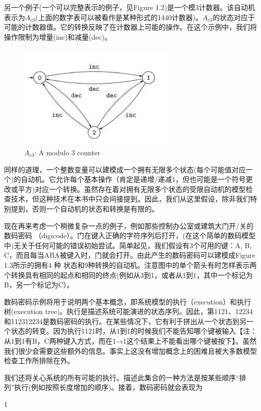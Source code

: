 \documentclass{book}
\begin{document}
    另一个例子(一个可以完整表示的例子，见Figure 1.2)是一个模3计数器。该自动机表示为$A_{c3}$(上面的数字表可以被看作是某种形式的1440计数器)。$A_{c3}$的状态对应于可能的计数器值。它的转换反映了在计数器上可能的操作。在这个示例中，我们将操作限制为增量(inc)和减量(dec)。
    \begin{figure}
    \centering
    \includegraphics[height=2.0in,width=3.0in]{1_2.jpg}
    \caption{$A_{c3}$: A modulo 3 counter}
    \end{figure}


    同样的道理，一个整数变量可以建模成一个拥有无限多个状态(每个可能值对应一个)的自动机。它允许每个基本操作（肯定是递增/递减1，但也可能是一个符号更改或平方)对应一个转换。虽然存在着对拥有无限多个状态的受限自动机的模型检查技术，但这种技术在本书中只会间接提到。因此，我们从这里假设，除非我们特别提到，否则一个自动机的状态和转换是有限的。

    现在再来考虑一个稍微复杂一点的例子，例如那些控制办公室或建筑大门开/关的数码密码  （digicode）。门在键入正确的字符序列后打开，(在这个简单的数码模型中)无关于任何可能的错误初始尝试。简单起见，我们假设有3个可用的键：A, B, C，而且每当ABA被键入时，门就会打开。由此产生的数码密码可以建模成Figure 1.3所示的拥有4 种 状态和9种转换的自动机。注意图中的单个箭头有时怎样表示两个转换具有相同的起点和相同的终点(例如从3到1，或者从1到1，其中一个标记为B，另一个标记为C）。

    数码密码示例将用于说明两个基本概念，即系统模型的执行（execution）和执行树(execution tree)。执行是描述系统可能演进的状态序列。因此，第1121、12234和112312234是数码密码的执行。在某些情况下，它有利于拼出从一个状态到另一个状态的转变。因为执行1121时，从1到1的时候我们不能告知哪个键被输入【注：从1到1有B，C两种键入方式，而在1→1这个结果上不能看出哪个键被按下】。虽然我们很少会需要这些额外的信息。事实上这没有增加概念上的困难且被大多数模型检查工作所排除在外。

    我们还将关心系统的所有可能的执行。描述此集合的一种方法是按某些顺序“排列”执行(例如按照长度增加的顺序)。接着，数码密码就会表现为

    1
\end{document}
